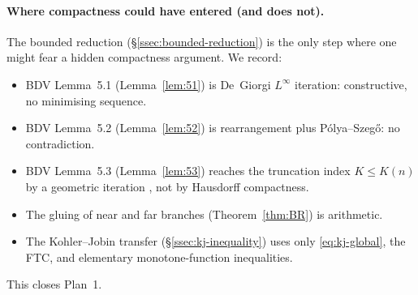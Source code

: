 \paragraph{Where compactness could have entered (and does not).}
The bounded reduction (\S\ref{ssec:bounded-reduction}) is the only step
where one might fear a hidden compactness argument. We record:
\begin{itemize}
\item BDV Lemma~5.1 (Lemma~\ref{lem:51}) is De~Giorgi
$L^\infty$ iteration: constructive, no minimising sequence.
\item BDV Lemma~5.2 (Lemma~\ref{lem:52}) is rearrangement plus
P\'olya--Szeg\H{o}: no contradiction.
\item BDV Lemma~5.3 (Lemma~\ref{lem:53}) reaches the truncation
index $K\le K(n)$ by a geometric iteration
\cite[(5.12)--(5.14)]{BDV}, not by Hausdorff compactness.
\item The gluing of near and far branches (Theorem~\ref{thm:BR}) is
arithmetic.
\item The Kohler--Jobin transfer (\S\ref{ssec:kj-inequality}) uses
only \eqref{eq:kj-global}, the FTC, and elementary monotone-function
inequalities.
\end{itemize}

This closes Plan~1.
